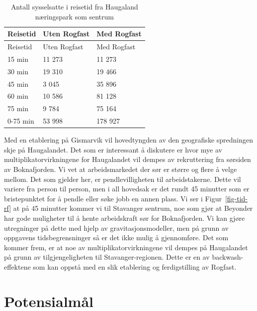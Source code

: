 \documentclass[
]{article}
\begin{document}
\hypertarget{tbl-rogfast}{}
\begin{longtable}[]{@{}lll@{}}
\caption{\label{tbl-rogfast}Antall sysselsatte i reisetid fra Haugaland
næringspark som sentrum }\tabularnewline
\toprule()
Reisetid & Uten Rogfast & Med Rogfast \\
\midrule()
\endfirsthead
\toprule()
Reisetid & Uten Rogfast & Med Rogfast \\
\midrule()
\endhead
15 min & 11 273 & 11 273 \\
30 min & 19 310 & 19 466 \\
45 min & 3 045 & 35 896 \\
60 min & 10 586 & 81 128 \\
75 min & 9 784 & 75 164 \\
0-75 min & 53 998 & 178 927 \\
\bottomrule()
\end{longtable}

Med en etablering på Gismarvik vil hovedtyngden av den geografiske
spredningen skje på Haugalandet. Det som er interessant å diskutere er
hvor mye av multiplikatorvirkningene for Haugalandet vil dempes av
rekruttering fra sørsiden av Boknafjorden. Vi vet at arbeidsmarkedet der
sør er større og flere å velge mellom. Det som gjelder her, er
pendlevilligheten til arbeidstakerne. Dette vil variere fra person til
person, men i all hovedsak er det rundt 45 minutter som er bristepunktet
for å pendle eller søke jobb en annen plass. Vi ser i
Figur~\ref{fig-tid-rf} at på 45 minutter kommer vi til Stavanger
sentrum, noe som gjør at Beyonder har gode muligheter til å hente
arbeidskraft sør for Boknafjorden. Vi kan gjøre utregninger på dette med
hjelp av gravitasjonsmodeller, men på grunn av oppgavens
tidsbegrensninger så er det ikke mulig å gjennomføre. Det som kommer
frem, er at noe av multiplikatorvirkningene vil dempes på Haugalandet på
grunn av tilgjengeligheten til Stavanger-regionen. Dette er en av
backwash-effektene som kan oppstå med en slik etablering og
ferdigstilling av Rogfast.

\newpage

\hypertarget{potensialmuxe5l}{%
\section{Potensialmål}\label{potensialmuxe5l}}
\end{document}
